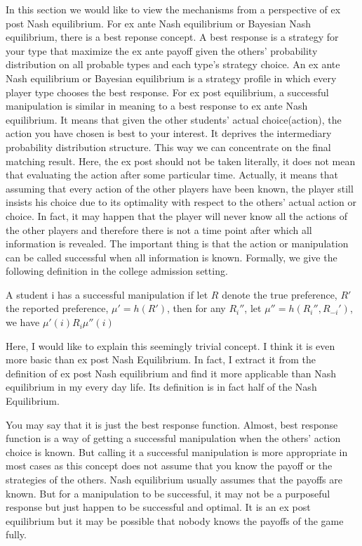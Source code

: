In this section we would like to view the mechanisms from a perspective of ex post Nash equilibrium.
For ex ante Nash equilibrium or Bayesian Nash equilibrium, there is a  best reponse concept.
A best response is a strategy for your type that maximize the ex ante payoff given the others' probability distribution on all probable types and each type's strategy choice. An ex ante Nash equilibrium or
Bayesian equilibrium is a strategy profile in which every player type chooses the best response. 
For ex post equilibrium,  a successful manipulation is similar in meaning to a best response to  ex ante Nash equilibrium. It means that given the other students' actual choice(action), the action you have
chosen is best to your interest. It deprives the intermediary probability distribution structure. This way we can concentrate on the final matching result.  Here, the ex post should not be taken 
literally, it does not mean that 
evaluating the action after some particular time. Actually, it means that assuming that every action of the other players have been known, the player still insists his choice due to its optimality with respect
to the others' actual action or choice. In fact, it may happen that the player will never know all the actions of the other players and therefore there is not a time point after which all information is revealed. 
The important thing is that the action or manipulation can be called successful when all information is known.
Formally, we give the following definition in the college admission setting. 
\begin{definition}
A student i has a successful manipulation 
if let $R$ denote the true preference, $R'$ the reported preference, $\mu' = h(R')$, then for any $R_i''$, let $\mu''= h(R_i'',R_{-i}')$, we have  $\mu'(i) R_i \mu''(i)$
\end{definition}

Here, I would like to explain this seemingly trivial concept. I think it is even more basic than ex post Nash Equilibrium. In fact, I extract it from the definition of ex post Nash equilibrium and find it more applicable than Nash equilibrium in my every day life. Its definition is in fact half of the Nash Equilibrium.

You may say that it is just the best response function. Almost, best response function is a way of getting a successful manipulation when the others' action choice is known. But calling it a successful manipulation is more appropriate in most cases as this concept does not assume that you know the payoff or the strategies of the others. Nash equilibrium usually assumes that the payoffs are known. But for a manipulation to be successful, it may not be a purposeful response but just happen to be successful and optimal. It is an ex post equilibrium but it may be possible that 
nobody knows the payoffs of the game fully.

